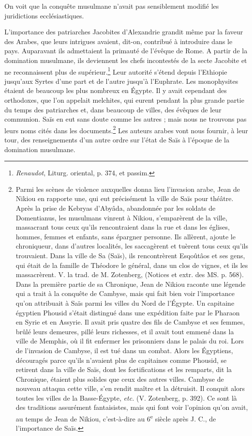 \documentclass[a4paper, 11pt, oneside]{article}
\begin{document}
On voit que la conquête musulmane n'avait pas sensiblement modifié les juridictions ecclésiastiques.

L'importance des patriarches Jacobites d'Alexandrie grandit même par la faveur des Arabes, que leurs intrigues avaient, dit-on, contribué à introduire dans le pays. Auparavant ils admettaient la primauté de l'évêque de Rome. A partir de la domination musulmane, ils deviennent les chefs incontestés de la secte Jacobite et ne reconnaissent plus de supérieur.\footnote{\emph{Renaudot}, Liturg. oriental, p. 374, et passim.} Leur autorité s'étend depuis l'Ethiopie jusqu'aux Syrtes d'une part et de l'autre jusqu'à l'Euphrate. Les monophysites étaient de beaucoup les plus nombreux en Égypte. Il y avait cependant des orthodoxes, que l'on appelait melchites, qui eurent pendant la plus grande partie du temps des patriarches et, dans beaucoup de villes, des évêques de leur communion. Saïs en eut sans doute comme les autres ; mais nous ne trouvons pas leurs noms cités dans les documents.\footnote{Parmi les scènes de violence auxquelles donna lieu l'invasion arabe, Jean de Nikiou en rapporte une, qui eut précisément la ville de Saïs pour théâtre. Après la prise de Kebryas d'Abyâda, abandonnée par les soldats de Domentianus, les musulmans vinrent à Nikiou, s'emparèrent de la ville, massacrant tous ceux qu'ils rencontraient dans la rue et dans les églises, hommes, femmes et enfants, sans épargner personne. Ils allèrent, ajoute le chroniqueur, dans d'autres localités, les saccagèrent et tuèrent tous ceux qu'ils trouvaient. Dans la ville de Sa (Saïs), ils rencontrèrent Esqoûtâos et ses gens, qui était de la famille de Théodore le général, dans un clos de vignes, et ils les massacrèrent. V. la trad. de M. Zotenberg, (Notices et extr. des MS. p. 568).\\\hspace*{5mm}Dans la première partie de sa Chronique, Jean de Nikiou raconte une légende qui a trait à la conquête de Cambyse, mais qui fait bien voir l'importance qu'on attribuait à Saïs parmi les villes du Nord de l'Égypte. Un capitaine égyptien Phousid s'était distingué dans une expédition faite par le Pharaon en Syrie et en Assyrie. Il avait pris quatre des fils de Cambyse et ses femmes, brûlé leurs demeures, pillé leurs richesses, et il avait tout emmené dans la ville de Memphis, où il fit enfermer les prisonniers dans le palais du roi. Lors de l'invasion de Cambyse, il est tué dans un combat. Alors les Égyptiens, découragés parce qu’ils n'avaient plus de capitaines comme Phousid, se retirent dans la ville de Saïs, dont les fortifications et les remparts, dit la Chronique, étaient plus solides que ceux des autres villes. Cambyse de nouveau attaqua cette ville, s'en rendit maître et la détruisit. Il conquit alors toutes les villes de la Basse-Égypte, \emph{etc.} (V. Zotenberg, p. 392). Ce sont là des traditions assurément fantaisistes, mais qui font voir l'opinion qu'on avait, au temps de Jean de Nikiou, c'est-à-dire au 6\textsuperscript{e} siècle après J. C., de l'importance de Saïs.}
\clearpage
Les auteurs arabes vont nous fournir, à leur tour, des renseignements d'un autre ordre sur l'état de Saïs à l'époque de la domination musulmane.
\end{document}

